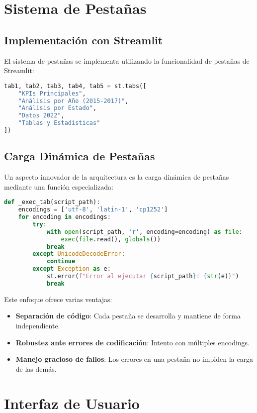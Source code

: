 \section{Sistema de Pestañas}

\subsection{Implementación con Streamlit}
El sistema de pestañas se implementa utilizando la funcionalidad de pestañas de Streamlit:

\begin{lstlisting}[language=Python, caption=Implementación del sistema de pestañas]
tab1, tab2, tab3, tab4, tab5 = st.tabs([
    "KPIs Principales", 
    "Análisis por Año (2015-2017)", 
    "Análisis por Estado", 
    "Datos 2022", 
    "Tablas y Estadísticas"
])
\end{lstlisting}

\subsection{Carga Dinámica de Pestañas}
Un aspecto innovador de la arquitectura es la carga dinámica de pestañas mediante una función especializada:

\begin{lstlisting}[language=Python, caption=Función para carga dinámica de pestañas]
def _exec_tab(script_path):
    encodings = ['utf-8', 'latin-1', 'cp1252']
    for encoding in encodings:
        try:
            with open(script_path, 'r', encoding=encoding) as file:
                exec(file.read(), globals())
            break
        except UnicodeDecodeError:
            continue
        except Exception as e:
            st.error(f"Error al ejecutar {script_path}: {str(e)}")
            break
\end{lstlisting}

Este enfoque ofrece varias ventajas:
\begin{itemize}
    \item \textbf{Separación de código}: Cada pestaña se desarrolla y mantiene de forma independiente.
    \item \textbf{Robustez ante errores de codificación}: Intento con múltiples encodings.
    \item \textbf{Manejo gracioso de fallos}: Los errores en una pestaña no impiden la carga de las demás.
\end{itemize}

\section{Interfaz de Usuario}

